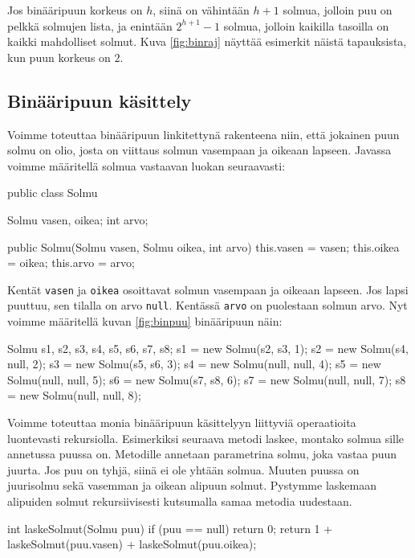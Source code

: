 Jos binääripuun korkeus on $h$, siinä on vähintään $h+1$ solmua,
jolloin puu on pelkkä solmujen lista,
ja enintään $2^{h+1}-1$ solmua,
jolloin kaikilla tasoilla on kaikki mahdolliset solmut.
Kuva \ref{fig:binraj} näyttää esimerkit näistä tapauksista,
kun puun korkeus on $2$.

\subsection{Binääripuun käsittely}

Voimme toteuttaa binääripuun linkitettynä rakenteena niin,
että jokainen puun solmu on olio, josta on viittaus
solmun vasempaan ja oikeaan lapseen.
Javassa voimme määritellä solmua vastaavan luokan seuraavasti:

\begin{code}
public class Solmu {
    Solmu vasen, oikea;
    int arvo;

    public Solmu(Solmu vasen, Solmu oikea, int arvo) {
        this.vasen = vasen;
        this.oikea = oikea;
        this.arvo = arvo;
    }
}
\end{code}

Kentät \texttt{vasen} ja \texttt{oikea} osoittavat solmun
vasempaan ja oikeaan lapseen.
Jos lapsi puuttuu, sen tilalla on arvo \texttt{null}.
Kentässä \texttt{arvo} on puolestaan solmun arvo.
Nyt voimme määritellä kuvan \ref{fig:binpuu} binääripuun näin:

\begin{code}
Solmu s1, s2, s3, s4, s5, s6, s7, s8;
s1 = new Solmu(s2, s3, 1);
s2 = new Solmu(s4, null, 2);
s3 = new Solmu(s5, s6, 3);
s4 = new Solmu(null, null, 4);
s5 = new Solmu(null, null, 5);
s6 = new Solmu(s7, s8, 6);
s7 = new Solmu(null, null, 7);
s8 = new Solmu(null, null, 8);
\end{code}

Voimme toteuttaa monia binääripuun käsittelyyn liittyviä
operaatioita luontevasti rekursiolla.
Esimerkiksi seuraava metodi laskee, montako solmua
sille annetussa puussa on.
Metodille annetaan parametrina solmu,
joka vastaa puun juurta.
Jos puu on tyhjä, siinä ei ole yhtään solmua.
Muuten puussa on juurisolmu sekä vasemman
ja oikean alipuun solmut.
Pystymme laskemaan alipuiden solmut rekursiivisesti
kutsumalla samaa metodia uudestaan.

\begin{code}
int laskeSolmut(Solmu puu) {
    if (puu == null) return 0;
    return 1 + laskeSolmut(puu.vasen) + laskeSolmut(puu.oikea);
}
\end{code}

